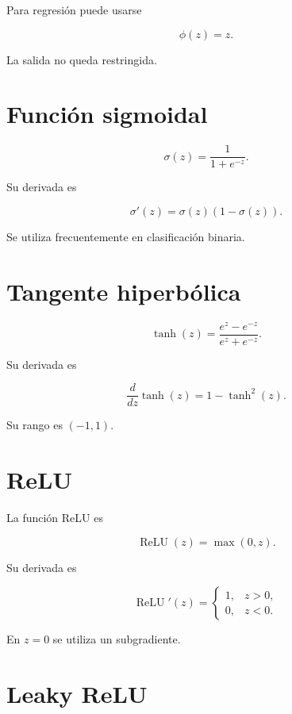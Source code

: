 \documentclass[
  spanish,
  10.5pt,
  letterpaper,
  DIV=11,
  numbers=noendperiod,
  oneside,
  open=any]{scrreprt}
\theoremstyle{definition}
\theoremstyle{definition}
\theoremstyle{plain}
\theoremstyle{remark}
\begin{document}

Para regresión puede usarse

\[
\phi(z)=z.
\]

La salida no queda restringida.

\section*{Función sigmoidal}\label{funciuxf3n-sigmoidal}


\[
\sigma(z)
=
\frac{1}{1+e^{-z}}.
\]

Su derivada es

\[
\sigma'(z)
=
\sigma(z)
\left(
1-\sigma(z)
\right).
\]

Se utiliza frecuentemente en clasificación binaria.

\section*{Tangente hiperbólica}\label{tangente-hiperbuxf3lica}


\[
\tanh(z)
=
\frac{e^z-e^{-z}}{e^z+e^{-z}}.
\]

Su derivada es

\[
\frac{d}{dz}\tanh(z)
=
1-\tanh^2(z).
\]

Su rango es \((-1,1)\).

\section*{ReLU}\label{relu}


La función ReLU es

\[
\operatorname{ReLU}(z)
=
\max(0,z).
\]

Su derivada es

\[
\operatorname{ReLU}'(z)
=
\begin{cases}
1, & z>0,\\
0, & z<0.
\end{cases}
\]

En \(z=0\) se utiliza un subgradiente.

\section*{Leaky ReLU}\label{leaky-relu}
\end{document}
